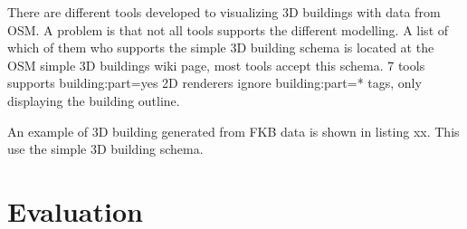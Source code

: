 There are different tools developed to visualizing 3D buildings with data from OSM. A problem is that not all tools supports the different modelling. A list of which of them who supports the simple 3D building schema is located at the OSM simple 3D buildings wiki page, most tools accept this schema. 7 tools supports building:part=yes %
2D renderers ignore building:part=* tags, only displaying the building outline. %

An example of 3D building generated from FKB data is shown in listing xx. This use the simple 3D building schema. 



\section{Evaluation}

